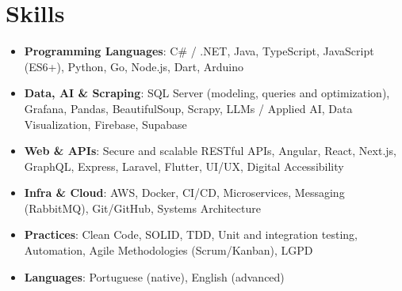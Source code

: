\documentclass[letterpaper,11pt]{article}
\newcommand{\resumeSubHeadingListStart}{\begin{itemize}[leftmargin=*]}
\newcommand{\resumeSubHeadingListEnd}{\end{itemize}}
\begin{document}
%
\section{Skills}
 \resumeSubHeadingListStart
   \item{
     \textbf{Programming Languages}{: C\# / .NET, Java, TypeScript, JavaScript (ES6+), Python, Go, Node.js, Dart, Arduino}
   }
   \item{
     \textbf{Data, AI \& Scraping}{: SQL Server (modeling, queries and optimization), Grafana, Pandas, BeautifulSoup, Scrapy, LLMs / Applied AI, Data Visualization, Firebase, Supabase}
   }
   \item{
     \textbf{Web \& APIs}{: Secure and scalable RESTful APIs, Angular, React, Next.js, GraphQL, Express, Laravel, Flutter, UI/UX, Digital Accessibility}
   }
   \item{
     \textbf{Infra \& Cloud}{: AWS, Docker, CI/CD, Microservices, Messaging (RabbitMQ), Git/GitHub, Systems Architecture}
   }
   \item{
     \textbf{Practices}{: Clean Code, SOLID, TDD, Unit and integration testing, Automation, Agile Methodologies (Scrum/Kanban), LGPD}
   }
   \item{
     \textbf{Languages}{: Portuguese (native), English (advanced)}
   }
 \resumeSubHeadingListEnd


\end{document}
